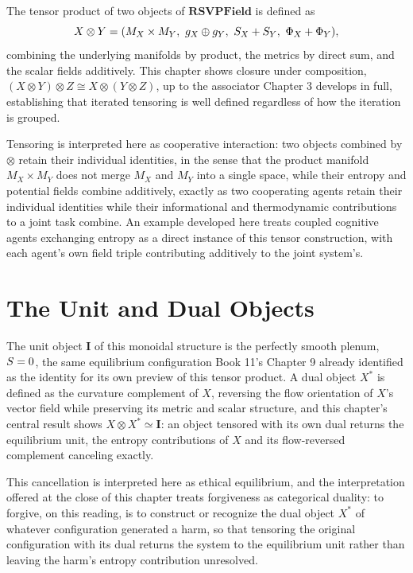 The tensor product of two objects of $\mathbf{RSVPField}$ is defined as
\[
X \otimes Y = (M_X \times M_Y,\ g_X \oplus g_Y,\ S_X + S_Y,\ \Phi_X + \Phi_Y),
\]
combining the underlying manifolds by product, the metrics by direct sum, and the scalar fields additively. This chapter shows closure under composition, $(X \otimes Y) \otimes Z \cong X \otimes (Y \otimes Z)$, up to the associator Chapter 3 develops in full, establishing that iterated tensoring is well defined regardless of how the iteration is grouped.

Tensoring is interpreted here as cooperative interaction: two objects combined by $\otimes$ retain their individual identities, in the sense that the product manifold $M_X \times M_Y$ does not merge $M_X$ and $M_Y$ into a single space, while their entropy and potential fields combine additively, exactly as two cooperating agents retain their individual identities while their informational and thermodynamic contributions to a joint task combine. An example developed here treats coupled cognitive agents exchanging entropy as a direct instance of this tensor construction, with each agent's own field triple contributing additively to the joint system's.

\chapter{The Unit and Dual Objects}

The unit object $\mathbf{I}$ of this monoidal structure is the perfectly smooth plenum, $S = 0$, the same equilibrium configuration Book 11's Chapter 9 already identified as the identity for its own preview of this tensor product. A dual object $X^{*}$ is defined as the curvature complement of $X$, reversing the flow orientation of $X$'s vector field while preserving its metric and scalar structure, and this chapter's central result shows $X \otimes X^{*} \simeq \mathbf{I}$: an object tensored with its own dual returns the equilibrium unit, the entropy contributions of $X$ and its flow-reversed complement canceling exactly.

This cancellation is interpreted here as ethical equilibrium, and the interpretation offered at the close of this chapter treats forgiveness as categorical duality: to forgive, on this reading, is to construct or recognize the dual object $X^{*}$ of whatever configuration generated a harm, so that tensoring the original configuration with its dual returns the system to the equilibrium unit rather than leaving the harm's entropy contribution unresolved.


